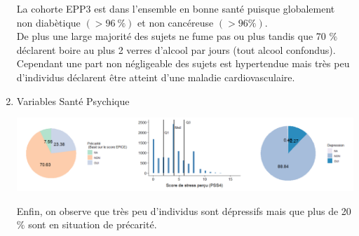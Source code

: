 \documentclass{book}
\begin{document}
\begin{enumerate}
\noindent
La cohorte EPP3 est dans l'ensemble en bonne santé puisque globalement non diabètique $(> 96 ~ \%)$ et non cancéreuse $(> 96 \%)$.\\

\noindent
De plus une large majorité des sujets ne fume pas ou plus tandis que 70 $\%$ déclarent boire au plus 2 verres d'alcool par jours (tout alcool confondus).\\

\noindent
Cependant une part non négligeable des sujets est hypertendue mais très peu d'individus déclarent être atteint d'une maladie cardiovasculaire.\\

\bigskip
\item Variables Santé Psychique
\begin{center}
\includegraphics[scale=.4]{tab_var_sante_psy.png}
\end{center}
Enfin, on observe que très peu d'individus sont dépressifs mais que plus de 20 $\%$ sont en situation de précarité.
\end{enumerate}




 
 
\end{document}
